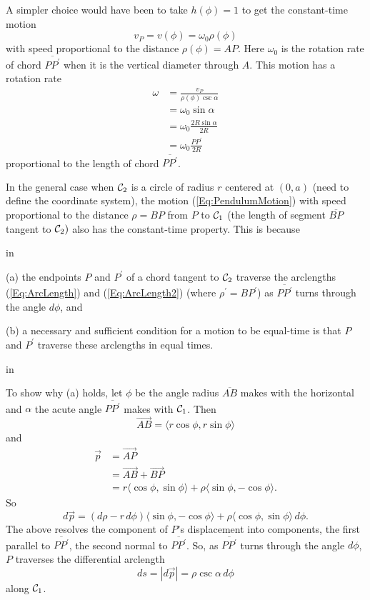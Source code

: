 \documentclass{ximera}
\newcommand{\pskip}{\vskip 0.1 in}
\begin{document}
A simpler choice would have been to take $h(\phi)=1$ to get the constant-time motion                  %
\begin{equation}
   v_P =   v(\phi) = \omega_0 \rho(\phi) \label{Eq:PendulumMotion} 
\end{equation}
with speed proportional to the distance $\rho(\phi) = AP$. Here $\omega_0$ is the rotation rate of chord $\overline{PP^\prime}$ when it is the vertical diameter through $A$. This motion has a rotation rate %
\begin{align*}
     \omega &= \frac{v_P}{\rho (\phi) \csc \alpha} \\
                 &= \omega_0 \sin\alpha  \\
                  & = \omega_0 \frac{2R \sin\alpha}{2R}  \\
                  &= \omega_0 \frac{PP^\prime}{2R} 
\end{align*}
proportional to the length of chord $\overline{PP^\prime}$.

In the general case when ${\cal C}_2$ is a circle of radius $r$ centered at $(0,a)$ (need to define the coordinate system), the motion (\ref{Eq:PendulumMotion}) with speed proportional to the distance $\rho = BP$ from $P$ to ${\cal C}_1$ (the length of segment $\overline{BP}$ tangent to ${\cal C}_2)$ also has the constant-time property. This is because

\pskip

(a) the endpoints $P$ and $P^\prime$ of a chord tangent to ${\cal C}_2$ traverse the arclengths (\ref{Eq:ArcLength}) and (\ref{Eq:ArcLength2}) (where $\rho^\prime =  BP^\prime$) as $\overline{PP^\prime}$ turns through the angle $d\phi$, and 

(b) a necessary and sufficient condition for a motion to be equal-time is that $P$ and $P^\prime$ traverse these arclengths in equal times.

\pskip

To show why (a) holds, let $\phi$ be the angle radius $\overline{AB}$ makes with the horizontal and $\alpha$ the acute angle $\overline{PP^\prime}$ makes with ${\cal C}_1$. Then 
\[
      \overrightarrow{AB} = \langle r\cos \phi, r\sin\phi \rangle
\]
and
\begin{align*}
    \overrightarrow{p} &= \overrightarrow{AP}   \\
                                &= \overrightarrow{AB}+\overrightarrow{BP} \\
                                &= r\langle \cos \phi, \sin \phi \rangle + \rho \langle \sin\phi, -\cos\phi  \rangle . 
\end{align*}
So
\[
    d\overrightarrow{p} = (d\rho - r \, d\phi ) \langle \sin \phi, -\cos \phi \rangle+ \rho \langle \cos\phi, \sin\phi \rangle \, d\phi .
\]
The above resolves the component of $P$'s displacement into components, the first parallel to $\overline{PP^\prime}$, the second normal to $\overline{PP^\prime}$. So, as $\overline{PP^\prime}$ turns through the angle $d\phi$, $P$ traverses the differential arclength
\[
   ds = |d\overrightarrow{p}| = \rho \csc \alpha \, d\phi
\]
along ${\cal C}_1$. 
\end{document}
